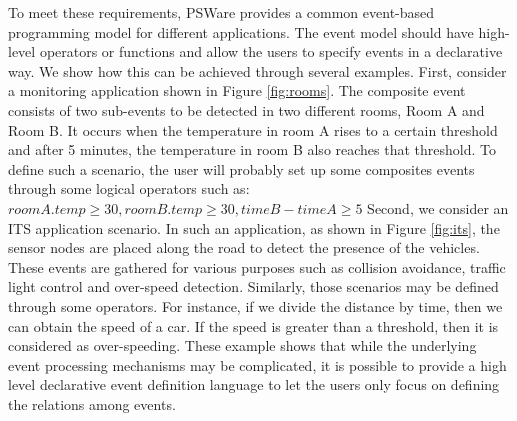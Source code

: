 To meet these requirements, PSWare provides a common event-based programming model for different applications. The event model should have high-level operators or functions and allow the users to specify events in a declarative way. We show how this can be achieved through several examples. First, consider a monitoring application shown in Figure \ref{fig:rooms}. The composite event consists of two sub-events to be detected in two different rooms, Room A and Room B. It occurs when the temperature in room A rises to a certain threshold and after 5 minutes, the temperature in room B also reaches that threshold. To define such a scenario, the user will probably set up some composites events through some logical operators such as: \(roomA.temp \geq 30, roomB.temp \geq 30, timeB - timeA \geq 5\) Second, we consider an ITS application scenario. In such an application, as shown in Figure \ref{fig:its}, the sensor nodes are placed along the road to detect the presence of the vehicles. These events are gathered for various purposes such as collision avoidance, traffic light control and over-speed detection. Similarly, those scenarios may be defined through some operators. For instance, if we divide the distance by time, then we can obtain the speed of a car. If the speed is greater than a threshold, then it is considered as over-speeding. These example shows that while the underlying event processing mechanisms may be complicated, it is possible to provide a high level declarative event definition language to let the users only focus on defining the relations among events.

